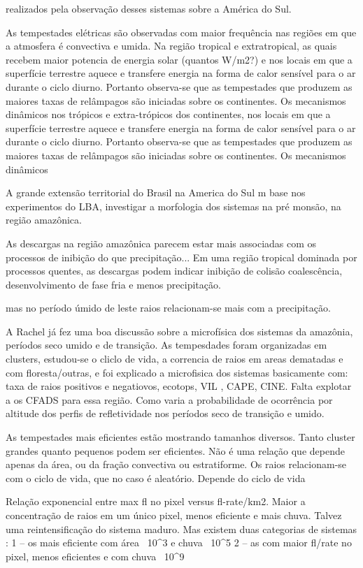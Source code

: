  realizados pela observação desses sistemas sobre a América do Sul.

	As tempestades elétricas 	são observadas com maior frequência nas regiões em que a atmosfera é convectiva e umida. Na região tropical e extratropical, as quais recebem maior potencia de energia solar (quantos W/m2?) e nos locais em que a superfície terrestre aquece e transfere energia na forma de calor sensível para o ar durante o ciclo diurno. Portanto observa-se que as tempestades que produzem as maiores taxas de relâmpagos são iniciadas sobre os continentes. 
	Os mecanismos dinâmicos 
nos trópicos e extra-trópicos dos continentes,   
nos locais em que a superfície terrestre aquece e transfere energia na forma de calor sensível para o ar durante o ciclo diurno. Portanto observa-se que as tempestades que produzem as maiores taxas de relâmpagos são iniciadas sobre os continentes. 
	Os mecanismos dinâmicos 


A grande extensão territorial do Brasil na America do Sul  
m base nos experimentos do LBA, investigar a morfologia dos sistemas na pré monsão, na região amazônica. 

As descargas na região amazônica parecem estar mais associadas com os processos de inibição do que precipitação... Em uma região tropical dominada por processos quentes, as descargas podem indicar inibição de colisão coalescência, desenvolvimento de fase fria e menos precipitação.

mas no período úmido de leste raios relacionam-se mais com a precipitação.

A Rachel já fez uma boa discussão sobre a microfísica dos sistemas da amazônia, períodos seco umido e de transição. As tempesdades foram organizadas em clusters, estudou-se o cliclo de vida, a correncia de raios em areas dematadas e com floresta/outras, e foi explicado a microfisica dos sistemas basicamente com: taxa de raios positivos e negatiovos, ecotops, VIL , CAPE, CINE. Falta explotar a os CFADS para essa região. Como varia a probabilidade de ocorrência por altitude dos perfis de refletividade nos períodos seco de transição e umido.



As tempestades mais eficientes estão mostrando tamanhos diversos. Tanto cluster grandes quanto pequenos podem ser eficientes. Não é uma relação que depende apenas da área, ou da fração convectiva ou estratiforme. Os raios relacionam-se com o ciclo de vida, que no caso é aleatório. Depende do ciclo de vida

Relação exponencial entre max fl no pixel versus fl-rate/km2. Maior a concentração de raios em um único pixel, menos eficiente e mais chuva. Talvez uma reintensificação do sistema maduro. Mas existem duas categorias de sistemas :
1 – os mais eficiente com área ~10^3 e chuva ~10^5
2 – as com maior fl/rate no pixel, menos eficientes e com chuva ~10^9